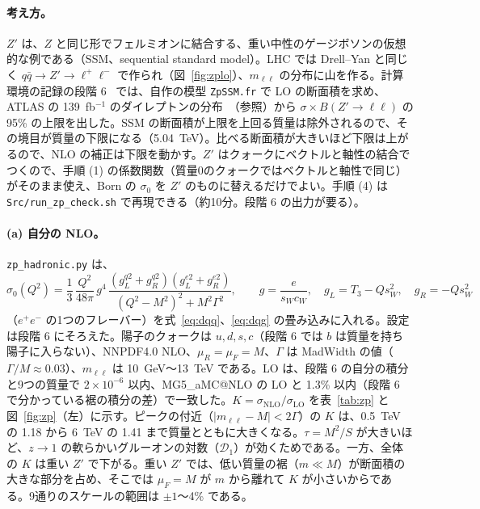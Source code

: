 \documentclass[a4paper,10pt]{ltjsarticle}
\makeatletter
\newcommand{\MGaMC}{MG5\_aMC@NLO}
\makeatother
\begin{document}
\paragraph{考え方。}$Z'$ は、$Z$ と同じ形でフェルミオンに結合する、重い中性のゲージボソンの仮想的な例である（SSM、sequential standard model）。LHC では Drell--Yan と同じく $q\bar q\to Z'\to\ell^+\ell^-$ で作られ（図~\ref{fig:zplo}）、$m_{\ell\ell}$ の分布に山を作る。計算環境の記録の段階 6~\cite{env} では、自作の模型 \texttt{ZpSSM.fr} で LO の断面積を求め、ATLAS の 139~fb$^{-1}$ のダイレプトンの分布~\cite{atlasll}（参照）から $\sigma\times B(Z'\to\ell\ell)$ の 95\% の上限を出した。SSM の断面積が上限を上回る質量は除外されるので、その境目が質量の下限になる（5.04~TeV）。比べる断面積が大きいほど下限は上がるので、NLO の補正は下限を動かす。$Z'$ はクォークにベクトルと軸性の結合でつくので、手順 (1) の係数関数（質量0のクォークではベクトルと軸性で同じ）がそのまま使え、Born の $\sigma_0$ を $Z'$ のものに替えるだけでよい。手順 (4) は \texttt{Src/run\_zp\_check.sh} で再現できる（約10分。段階 6 の出力が要る）。

\paragraph{(a) 自分の NLO。}\texttt{zp\_hadronic.py} は、
\[
\sigma_0(Q^2)=\frac13\,\frac{Q^2}{48\pi}\,g^4\,\frac{(g_L^{q2}+g_R^{q2})(g_L^{e2}+g_R^{e2})}{(Q^2-M^2)^2+M^2\Gamma^2},\qquad g=\frac e{s_Wc_W},\quad g_L=T_3-Qs_W^2,\quad g_R=-Qs_W^2
\]
（$e^+e^-$ の1つのフレーバー）を式~\eqref{eq:dqq}、\eqref{eq:dqg} の畳み込みに入れる。設定は段階 6 にそろえた。陽子のクォークは $u,d,s,c$（段階 6 では $b$ は質量を持ち陽子に入らない）、NNPDF4.0 NLO、$\mu_R=\mu_F=M$、$\Gamma$ は MadWidth の値（$\Gamma/M\approx0.03$）、$m_{\ell\ell}$ は 10~GeV〜13~TeV である。LO は、段階 6 の自分の積分と9つの質量で $2\times10^{-6}$ 以内、\MGaMC{} の LO と 1.3\% 以内（段階 6 で分かっている裾の積分の差）で一致した。$K=\sigma_{\mathrm{NLO}}/\sigma_{\mathrm{LO}}$ を表~\ref{tab:zp} と図~\ref{fig:zp}（左）に示す。ピークの付近（$|m_{\ell\ell}-M|<2\Gamma$）の $K$ は、0.5~TeV の 1.18 から 6~TeV の 1.41 まで質量とともに大きくなる。$\tau=M^2/S$ が大きいほど、$z\to1$ の軟らかいグルーオンの対数（$\mathcal D_1$）が効くためである。一方、全体の $K$ は重い $Z'$ で下がる。重い $Z'$ では、低い質量の裾（$m\ll M$）が断面積の大きな部分を占め、そこでは $\mu_F=M$ が $m$ から離れて $K$ が小さいからである。9通りのスケールの範囲は $\pm1$〜4\% である。
\end{document}

